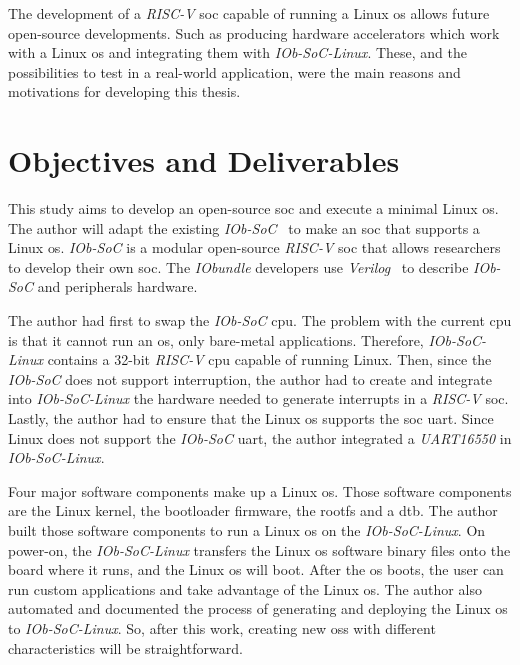 The development of a \textit{RISC-V} \acrshort{soc} capable of running a Linux \acrshort{os} allows future open-source developments. Such as producing hardware accelerators which work with a Linux \acrshort{os} and integrating them with \textit{IOb-SoC-Linux}. These, and the possibilities to test in a real-world application, were the main reasons and motivations for developing this thesis.

\section{Objectives and Deliverables}
\label{section:objectives}
This study aims to develop an open-source \acrshort{soc} and execute a minimal Linux \acrshort{os}. The author will adapt the existing \textit{IOb-SoC}~\cite{iob_soc} to make an \acrshort{soc} that supports a Linux \acrshort{os}. \textit{IOb-SoC} is a modular open-source \textit{RISC-V} \acrshort{soc} that allows researchers to develop their own \acrshort{soc}. The \textit{IObundle} developers use \textit{Verilog}~\cite{thomas2008verilog} to describe \textit{IOb-SoC} and peripherals hardware.

The author had first to swap the \textit{IOb-SoC} \acrshort{cpu}. The problem with the current \acrshort{cpu} is that it cannot run an \acrshort{os}, only bare-metal applications. Therefore, \textit{IOb-SoC-Linux} contains a 32-bit \textit{RISC-V} \acrshort{cpu} capable of running Linux. Then, since the \textit{IOb-SoC} does not support interruption, the author had to create and integrate into \textit{IOb-SoC-Linux} the hardware needed to generate interrupts in a \textit{RISC-V} \acrshort{soc}. Lastly, the author had to ensure that the Linux \acrshort{os} supports the \acrshort{soc} \acrshort{uart}. Since Linux does not support the \textit{IOb-SoC} \acrshort{uart}, the author integrated a \textit{UART16550} in \textit{IOb-SoC-Linux}.

Four major software components make up a Linux \acrshort{os}. Those software components are the Linux kernel, the bootloader firmware, the \acrfull{rootfs} and a \acrfull{dtb}. The author built those software components to run a Linux \acrshort{os} on the \textit{IOb-SoC-Linux}. On power-on, the \textit{IOb-SoC-Linux} transfers the Linux \acrshort{os} software binary files onto the board where it runs, and the Linux \acrshort{os} will boot. After the \acrshort{os} boots, the user can run custom applications and take advantage of the Linux \acrshort{os}. The author also automated and documented the process of generating and deploying the Linux \acrshort{os} to \textit{IOb-SoC-Linux}. So, after this work, creating new \acrshort{os}s with different characteristics will be straightforward.

